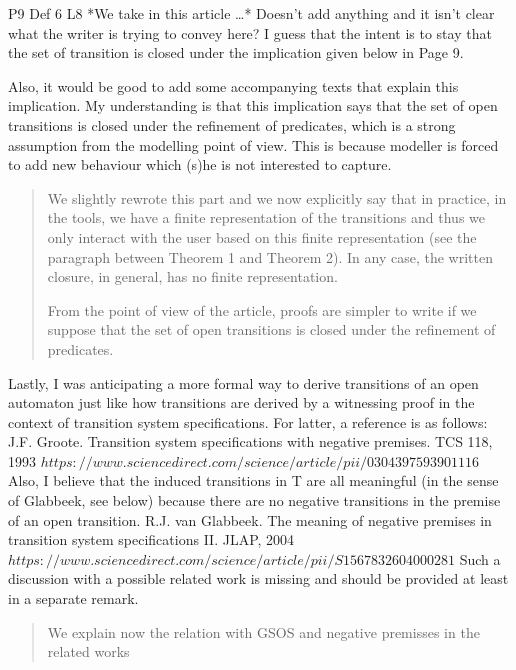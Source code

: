 \documentclass{article}
\begin{document}
P9 Def 6 L8 *We take in this article …* Doesn’t add anything and it isn’t clear what the writer is trying to convey here? I guess that the intent is to stay that the set of transition is closed under the implication given below in Page 9.

Also, it would be good to add some accompanying texts that explain this implication. My understanding is that this implication says that the set of open transitions is closed under the
refinement of predicates, which is a strong assumption from the modelling point of view. This is because modeller is forced to add new behaviour which (s)he is not interested to capture.
\begin{quote}
We slightly rewrote this part and we now explicitly say that in practice, in the tools, we have a finite representation of the transitions and thus we only interact with the user based on this finite representation (see the paragraph between Theorem 1 and Theorem 2). In any case, the written closure, in general, has no finite representation. 

From the point of view of the article, proofs are simpler to write if we suppose that  the set of open transitions is closed under the
refinement of predicates.
\end{quote}


Lastly, I was anticipating a more formal way to derive transitions of an open automaton just like how transitions are derived by a witnessing proof in the context of transition system specifications. For latter, a reference is as follows:
J.F. Groote. Transition system specifications with negative premises. TCS 118, 1993 $https://www.sciencedirect.com/science/article/pii/0304397593901116$
Also, I believe that the induced transitions in T are all meaningful (in the sense of Glabbeek, see below) because there are no negative transitions in the premise of an open transition.
R.J. van Glabbeek. The meaning of negative premises in transition system specifications II. JLAP, 2004 $https://www.sciencedirect.com/science/article/pii/S1567832604000281$
Such a discussion with a possible related work is missing and should be provided at least in a separate remark.

\begin{quote}
We explain now the relation with GSOS and negative premisses in the related works
\end{quote}
\end{document}
